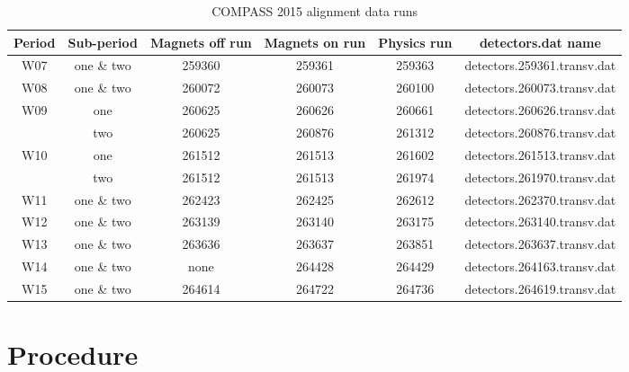 \begin{table}[h!t]
  \centering
  \begin{tabular}{ |c|c|c|c|c|c| }
    \hline
    \textbf{Period}& \textbf{Sub-period}& \textbf{Magnets off run}&
    \textbf{Magnets on run}& \textbf{Physics run}&
    \textbf{detectors.dat name} \\ \hline
    
    W07& one \& two & 259360& 259361& 259363& detectors.259361.transv.dat
    \\ \hline

    W08& one \& two & 260072& 260073& 260100& detectors.260073.transv.dat
    \\ \hline

    \multirow{2}{2em}{W09}& one& 260625& 260626& 260661&
    detectors.260626.transv.dat \\
    & two& 260625& 260876& 261312&
    detectors.260876.transv.dat \\ \hline

    \multirow{2}{2em}{W10}& one& 261512& 261513& 261602&
    detectors.261513.transv.dat \\
    & two& 261512& 261513& 261974&
    detectors.261970.transv.dat \\ \hline

    W11& one \& two & 262423& 262425& 262612& detectors.262370.transv.dat
    \\ \hline

    W12& one \& two & 263139& 263140& 263175& detectors.263140.transv.dat
    \\ \hline

    W13& one \& two & 263636& 263637& 263851& detectors.263637.transv.dat
    \\ \hline

    W14& one \& two & none& 264428& 264429& detectors.264163.transv.dat
    \\ \hline

    W15& one \& two & 264614& 264722& 264736& detectors.264619.transv.dat
    \\ \hline
    
  \end{tabular}
  \caption{COMPASS 2015 alignment data runs}
  \label{tab::alignmentRuns}
\end{table}


\section{Procedure}

